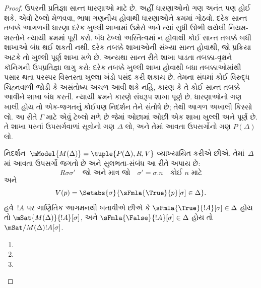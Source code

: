 \begin{proof}
ઉપરની પ્રતિજ્ઞા સાન્ત ધારણાઓ માટે છે. અહીં ધારણાઓનો ગણ
અનંત પણ હોઈ શકે. એવો ટેબ્લો મેળવવા, ભાષા ગણનીય
હોવાથી ધારણાઓને ક્રમમાં
ગોઠવો. દરેક સાન્ત તબક્કે આગળની ધારણા દરેક ખુલ્લી શાખામાં
ઉમેરો અને ત્યાં સુધી ઊભી થયેલી નિયમ-શરતોને ન્યાયી ક્રમમાં
પૂરી કરો. બંધ ટેબ્લો અસ્તિત્વમાં ન હોવાથી કોઈ સાન્ત
તબક્કે બધી શાખાઓ બંધ થઈ શકતી નથી. દરેક તબક્કે શાખાઓની
સંખ્યા સાન્ત હોવાથી, જો પ્રક્રિયા અટકે તો ખુલ્લી પૂર્ણ
શાખા મળે છે. અન્યથા સાન્ત રીતે શાખા પાડતા તબક્કા-વૃક્ષને
કૉનિગની ઉપપ્રતિજ્ઞા લાગુ કરો: દરેક તબક્કે ખુલ્લી શાખા હોવાથી
બધા તબક્કાઓમાંથી પસાર થતા પરસ્પર વિસ્તરતા ખુલ્લા ખંડો
પસંદ કરી શકાય છે. તેમના સંઘમાં કોઈ વિરુદ્ધ ચિહ્નવાળી જોડી
કે અસંતોષ્ય અચળ આવી શકે નહિ, કારણ કે તે કોઈ સાન્ત તબક્કે
આવીને શાખા બંધ કરતી. ન્યાયી ક્રમને કારણે સંઘરૂપ શાખા પૂર્ણ છે.
ધારણાઓનો ગણ ખાલી હોય તો એક-જગતનું કોઈપણ નિદર્શન તેને
સંતોષે છે; તેથી આગળ અખાલી કિસ્સો લો.
આ રીતે $\Gamma$ માટે એવું ટેબ્લો મળે છે જેમાં
ઓછામાં ઓછી એક શાખા ખુલ્લી અને પૂર્ણ છે. તે શાખા પરનાં
ઉપસર્ગવાળાં સૂત્રોનો ગણ $\Delta$ લો, અને તેમાં
આવતા ઉપસર્ગોનો ગણ $P(\Delta)$ લો.

નિદર્શન~$\mModel{M(\Delta)} = \tuple{P(\Delta), R, V}$
વ્યાખ્યાયિત કરીએ છીએ. તેમાં~$\Delta$માં આવતા ઉપસર્ગો
જગતો છે અને સુલભતા-સંબંધ આ રીતે અપાય છે:
\[
R\sigma\sigma' \quad \text{જો અને માત્ર જો} \quad
\sigma'=\sigma.n \quad \text{કોઈ~$n$ માટે}
\]
અને
\[
V(p) = \Setabs{\sigma}{\sFmla{\True}{p}[\sigma] \in \Delta}.
\]
હવે~$!A$ પર ગાણિતિક આગમનથી બતાવીએ છીએ કે
$\sFmla{\True}{!A}[\sigma] \in \Delta$ હોય તો
$\mSat{M(\Delta)}{!A}[\sigma]$, અને
$\sFmla{\False}{!A}[\sigma] \in \Delta$ હોય તો
$\mSat/{M(\Delta)}{!A}[\sigma]$.

\begin{enumerate}
  \item {}
  \item {}
  \item {}
\end{enumerate}
\end{proof}

